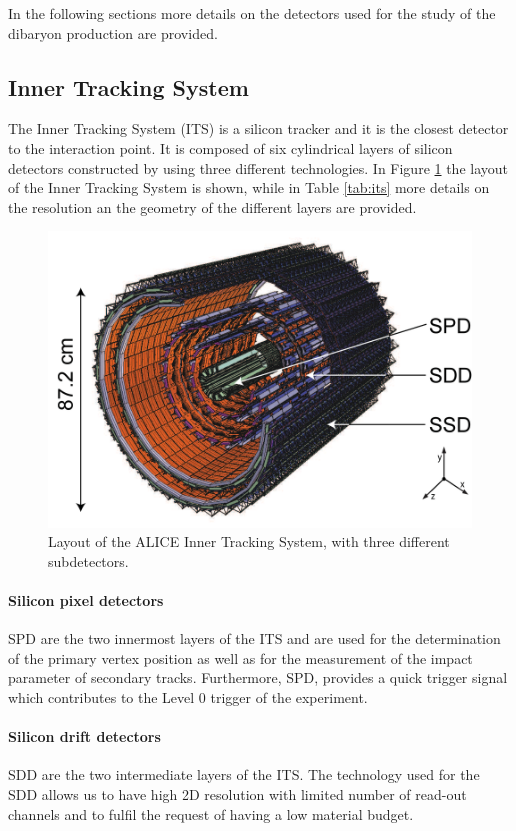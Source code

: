 In the following sections more details on the detectors used for the study of the \dst dibaryon
production are provided.

%
\subsection{Inner Tracking System} \label{sec:its}

The Inner Tracking System (ITS) \cite{alicemulti,alice:Perf2014} is a silicon tracker and it is
the closest detector to the interaction point.
It is composed of six cylindrical layers of silicon detectors constructed by using three different
technologies.
In Figure \ref{fig:its} the layout of the Inner Tracking System is shown, while in Table
\ref{tab:its} more details on the resolution an the geometry of the different layers are provided.

\begin{figure}
    \centering
    \includegraphics[width=0.7 \textwidth]{gfx/its}
	\caption{Layout of the ALICE Inner Tracking System, with three different subdetectors.}
	\label{fig:its}
\end{figure}

\paragraph{Silicon pixel detectors} 
SPD are the two innermost layers of the ITS and are
used for the determination of the primary vertex position as well as for the measurement of
the impact parameter of secondary tracks.
Furthermore, SPD, provides a quick trigger signal which contributes to the Level 0 trigger of 
the experiment.

\paragraph{Silicon drift detectors} 
SDD are the two intermediate layers of the ITS. The technology used for the SDD 
allows us to have high 2D resolution with limited number of read-out channels and to fulfil the
request of having a low material budget.

